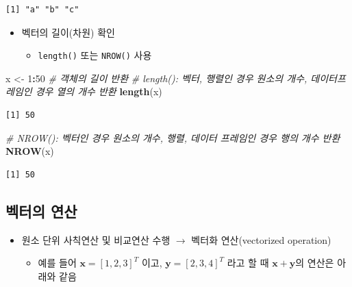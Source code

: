 \documentclass[
  11pt,
]{krantz}
\newenvironment{Shaded}{\begin{snugshade}}{\end{snugshade}}
\newcommand{\CommentTok}[1]{\textcolor[rgb]{0.37,0.37,0.37}{\textit{#1}}}
\newcommand{\DecValTok}[1]{\textcolor[rgb]{0.06,0.06,0.06}{#1}}
\newcommand{\KeywordTok}[1]{\textcolor[rgb]{0.27,0.27,0.27}{\textbf{#1}}}
\newcommand{\NormalTok}[1]{#1}
\newcommand{\OperatorTok}[1]{\textcolor[rgb]{0.43,0.43,0.43}{\textbf{#1}}}
\newcommand{\StringTok}[1]{\textcolor[rgb]{0.5,0.5,0.5}{#1}}
\providecommand{\tightlist}{%
  \setlength{\itemsep}{0pt}\setlength{\parskip}{0pt}}
\begin{document}
\begin{verbatim}
[1] "a" "b" "c"
\end{verbatim}

\normalsize

\begin{itemize}
\tightlist
\item
  벡터의 길이(차원) 확인

  \begin{itemize}
  \tightlist
  \item
    \texttt{length()} 또는 \texttt{NROW()} 사용
  \end{itemize}
\end{itemize}

\footnotesize

\begin{Shaded}
\begin{Highlighting}[]
\NormalTok{x <-}\StringTok{ }\DecValTok{1}\OperatorTok{:}\DecValTok{50}
\CommentTok{# 객체의 길이 반환}
\CommentTok{# length(): 벡터, 행렬인 경우 원소의 개수, 데이터프레임인 경우 열의 개수 반환}
\KeywordTok{length}\NormalTok{(x) }
\end{Highlighting}
\end{Shaded}

\begin{verbatim}
[1] 50
\end{verbatim}

\begin{Shaded}
\begin{Highlighting}[]
\CommentTok{# NROW(): 벡터인 경우 원소의 개수, 행렬, 데이터 프레임인 경우 행의 개수 반환}
\KeywordTok{NROW}\NormalTok{(x)}
\end{Highlighting}
\end{Shaded}

\begin{verbatim}
[1] 50
\end{verbatim}

\normalsize

\hypertarget{vector-operation}{%
\subsection{벡터의 연산}\label{vector-operation}}

\begin{itemize}
\tightlist
\item
  원소 단위 사칙연산 및 비교연산 수행 \(\rightarrow\) 벡터화 연산(vectorized operation)

  \begin{itemize}
  \tightlist
  \item
    예를 들어 \(\mathrm{\mathbf x} = [1, 2, 3]^T\) 이고, \(\mathrm{\mathbf y} = [2, 3, 4]^T\) 라고 할 때 \(\mathrm{\mathbf x} + \mathrm{\mathbf y}\)의 연산은 아래와 같음
  \end{itemize}
\end{itemize}
\end{document}
